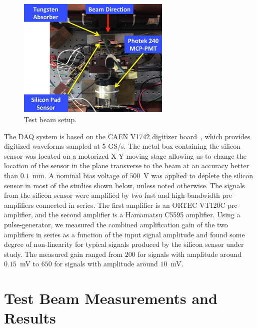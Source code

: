 \documentclass[12pt]{article}
\begin{document}
{\begin{figure}[htbp] 
\centering
\includegraphics[width=0.65\textwidth]{plots/BeamPhotoDiagram.pdf} 
\caption{Test beam setup.} 
\label{fig:BeamPhotoDiagram} 
\end{figure} 

The DAQ system is based on the CAEN V1742 digitizer board~\cite{CAENDRS}, which
provides digitized waveforms sampled at 5 GS/s. The metal box containing the
silicon sensor was located on a motorized X-Y moving stage allowing us to change
the location of the sensor in the plane transverse to the beam at an accuracy
better than $0.1$~mm. A nominal bias voltage of $500$~V was applied to deplete
the silicon sensor in most of the studies shown below, unless noted otherwise.
The signals from the silicon sensor were amplified by two fast and
high-bandwidth pre-amplifiers connected in series. The first amplifier is an
ORTEC VT120C pre-amplifier, and the second amplifier is a Hamamatsu C5595
amplifier. Using a pulse-generator, we measured the combined amplification gain
of the two amplifiers in series as a function of the input signal amplitude and
found some degree of non-linearity for typical signals produced by the silicon
sensor under study. The measured gain ranged from $200$ for signals with
amplitude around $0.15$~mV to $650$ for signals with amplitude around $10$~mV.

\section{Test Beam Measurements and Results} 
\label{sec:results} 

}
\end{document}
